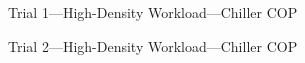\documentclass[10pt]{report}
\begin{document}
\begin{landscape}
\begin{figure}[!h]
    \caption{Trial 1---High-Density Workload---Chiller COP}
\end{figure}
\begin{figure}[!h]
  \centering

    \caption{Trial 2---High-Density Workload---Chiller COP}
\end{figure}
\begin{figure}[!h]
  \centering


\end{figure}
\end{landscape}
\end{document}
